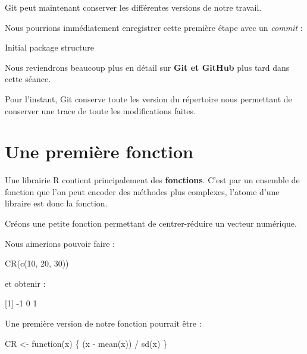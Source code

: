 \documentclass[
  letterpaper,
  DIV=11,
  numbers=noendperiod]{scrreprt}
\newenvironment{Shaded}{\begin{snugshade}}{\end{snugshade}}
\newcommand{\ControlFlowTok}[1]{\textcolor[rgb]{0.00,0.23,0.31}{#1}}
\newcommand{\DecValTok}[1]{\textcolor[rgb]{0.68,0.00,0.00}{#1}}
\newcommand{\FunctionTok}[1]{\textcolor[rgb]{0.28,0.35,0.67}{#1}}
\newcommand{\NormalTok}[1]{\textcolor[rgb]{0.00,0.23,0.31}{#1}}
\newcommand{\OtherTok}[1]{\textcolor[rgb]{0.00,0.23,0.31}{#1}}
\newcommand{\SpecialCharTok}[1]{\textcolor[rgb]{0.37,0.37,0.37}{#1}}
\begin{document}
Git peut maintenant conserver les différentes versions de notre travail.

Nous pourrions immédiatement enregistrer cette première étape avec un
\emph{commit} :

\begin{Shaded}
\begin{Highlighting}[]
\NormalTok{Initial package structure}
\end{Highlighting}
\end{Shaded}

Nous reviendrons beaucoup plus en détail sur \textbf{Git et GitHub} plus
tard dans cette séance.

Pour l'instant, Git conserve toute les version du répertoire nous
permettant de conserver une trace de toute les modifications faites.

\section{Une première fonction}\label{une-premiuxe8re-fonction}

Une librairie R contient principalement des \textbf{fonctions}. C'est
par un ensemble de fonction que l'on peut encoder des méthodes plus
complexes, l'atome d'une libraire est donc la fonction.

Créons une petite fonction permettant de centrer-réduire un vecteur
numérique.

Nous aimerions pouvoir faire :

\begin{Shaded}
\begin{Highlighting}[]
\FunctionTok{CR}\NormalTok{(}\FunctionTok{c}\NormalTok{(}\DecValTok{10}\NormalTok{, }\DecValTok{20}\NormalTok{, }\DecValTok{30}\NormalTok{))}
\end{Highlighting}
\end{Shaded}

et obtenir :

\begin{Shaded}
\begin{Highlighting}[]
\NormalTok{[1] {-}1 0 1}
\end{Highlighting}
\end{Shaded}

Une première version de notre fonction pourrait être :

\begin{Shaded}
\begin{Highlighting}[]
\NormalTok{CR }\OtherTok{\textless{}{-}} \ControlFlowTok{function}\NormalTok{(x) \{}
\NormalTok{  (x }\SpecialCharTok{{-}} \FunctionTok{mean}\NormalTok{(x)) }\SpecialCharTok{/} \FunctionTok{sd}\NormalTok{(x)}
\NormalTok{\}}
\end{Highlighting}
\end{Shaded}
\end{document}
